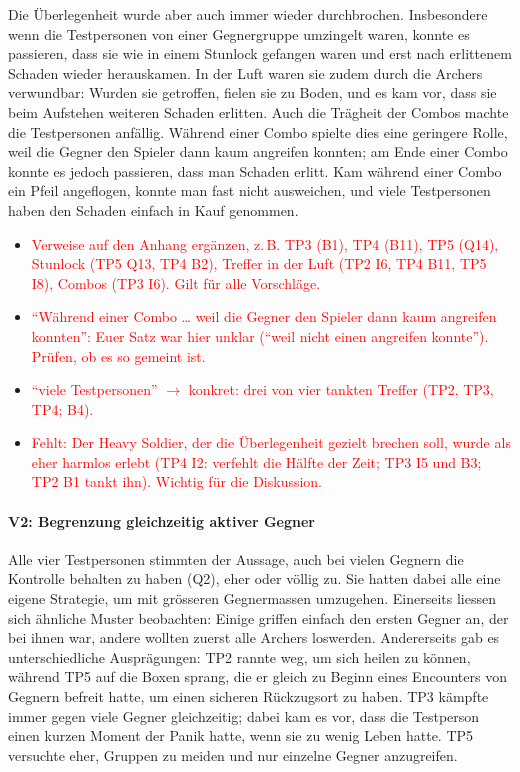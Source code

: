 \documentclass[../Main.tex]{subfiles}
\begin{document}
Die Überlegenheit wurde aber auch immer wieder durchbrochen. Insbesondere wenn die Testpersonen von einer Gegnergruppe umzingelt waren, konnte es passieren, dass sie wie in einem Stunlock gefangen waren und erst nach erlittenem Schaden wieder herauskamen. In der Luft waren sie zudem durch die Archers verwundbar: Wurden sie getroffen, fielen sie zu Boden, und es kam vor, dass sie beim Aufstehen weiteren Schaden erlitten. Auch die Trägheit der Combos machte die Testpersonen anfällig. Während einer Combo spielte dies eine geringere Rolle, weil die Gegner den Spieler dann kaum angreifen konnten; am Ende einer Combo konnte es jedoch passieren, dass man Schaden erlitt. Kam während einer Combo ein Pfeil angeflogen, konnte man fast nicht ausweichen, und viele Testpersonen haben den Schaden einfach in Kauf genommen.

\begin{itemize}[leftmargin=1.5cm]
    \item \textcolor{red}{Verweise auf den Anhang ergänzen, z.\,B. TP3 (B1), TP4 (B11), TP5 (Q14), Stunlock (TP5 Q13, TP4 B2), Treffer in der Luft (TP2 I6, TP4 B11, TP5 I8), Combos (TP3 I6). Gilt für alle Vorschläge.}
    \item \textcolor{red}{\enquote{Während einer Combo \ldots{} weil die Gegner den Spieler dann kaum angreifen konnten}: Euer Satz war hier unklar (\enquote{weil nicht einen angreifen konnte}). Prüfen, ob es so gemeint ist.}
    \item \textcolor{red}{\enquote{viele Testpersonen} $\rightarrow$ konkret: drei von vier tankten Treffer (TP2, TP3, TP4; B4).}
    \item \textcolor{red}{Fehlt: Der Heavy Soldier, der die Überlegenheit gezielt brechen soll, wurde als eher harmlos erlebt (TP4 I2: verfehlt die Hälfte der Zeit; TP3 I5 und B3; TP2 B1 tankt ihn). Wichtig für die Diskussion.}
\end{itemize}

\paragraph{V2: Begrenzung gleichzeitig aktiver Gegner}
Alle vier Testpersonen stimmten der Aussage, auch bei vielen Gegnern die Kontrolle behalten zu haben (Q2), eher oder völlig zu. Sie hatten dabei alle eine eigene Strategie, um mit grösseren Gegnermassen umzugehen. Einerseits liessen sich ähnliche Muster beobachten: Einige griffen einfach den ersten Gegner an, der bei ihnen war, andere wollten zuerst alle Archers loswerden. Andererseits gab es unterschiedliche Ausprägungen: TP2 rannte weg, um sich heilen zu können, während TP5 auf die Boxen sprang, die er gleich zu Beginn eines Encounters von Gegnern befreit hatte, um einen sicheren Rückzugsort zu haben. TP3 kämpfte immer gegen viele Gegner gleichzeitig; dabei kam es vor, dass die Testperson einen kurzen Moment der Panik hatte, wenn sie zu wenig Leben hatte. TP5 versuchte eher, Gruppen zu meiden und nur einzelne Gegner anzugreifen.
\end{document}

